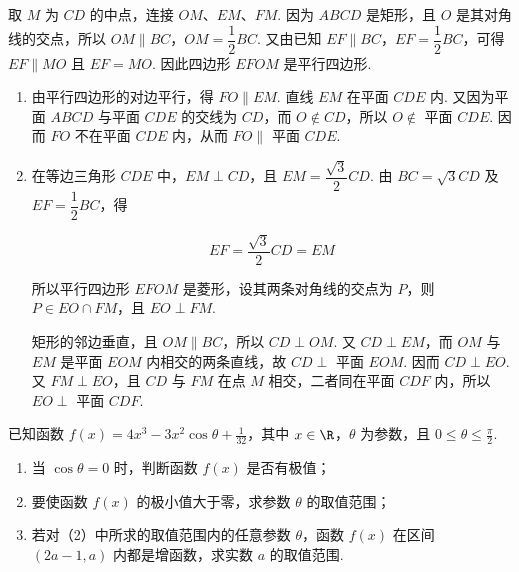 \begin{solution}
取 \(M\) 为 \(CD\) 的中点，连接 \(OM\)、\(EM\)、\(FM\). 因为 \(ABCD\) 是矩形，且 \(O\) 是其对角线的交点，所以 \(OM\parallel BC\)，\(OM=\dfrac{1}{2}BC\). 又由已知 \(EF\parallel BC\)，\(EF=\dfrac{1}{2}BC\)，可得 \(EF\parallel MO\) 且 \(EF=MO\). 因此四边形 \(EFOM\) 是平行四边形.

\begin{enumerate}
\item 由平行四边形的对边平行，得 \(FO\parallel EM\). 直线 \(EM\) 在平面 \(CDE\) 内. 又因为平面 \(ABCD\) 与平面 \(CDE\) 的交线为 \(CD\)，而 \(O\notin CD\)，所以 \(O\notin\) 平面 \(CDE\). 因而 \(FO\) 不在平面 \(CDE\) 内，从而 \(FO\parallel\) 平面 \(CDE\).

\item 在等边三角形 \(CDE\) 中，\(EM\perp CD\)，且 \(EM=\dfrac{\sqrt{3}}{2}CD\). 由 \(BC=\sqrt{3}CD\) 及 \(EF=\dfrac{1}{2}BC\)，得

\[
EF=\frac{\sqrt{3}}{2}CD=EM
\]

所以平行四边形 \(EFOM\) 是菱形，设其两条对角线的交点为 \(P\)，则 \(P\in EO\cap FM\)，且 \(EO\perp FM\).

矩形的邻边垂直，且 \(OM\parallel BC\)，所以 \(CD\perp OM\). 又 \(CD\perp EM\)，而 \(OM\) 与 \(EM\) 是平面 \(EOM\) 内相交的两条直线，故 \(CD\perp\) 平面 \(EOM\). 因而 \(CD\perp EO\). 又 \(FM\perp EO\)，且 \(CD\) 与 \(FM\) 在点 \(M\) 相交，二者同在平面 \(CDF\) 内，所以 \(EO\perp\) 平面 \(CDF\).
\end{enumerate}
\end{solution}

\begin{problem}
已知函数 \(f(x) = 4x^{3} - 3x^{2}\cos \theta + \frac{1}{32}\)，其中 \(x \in \R\)，\(\theta\) 为参数，且 \(0 \leqslant \theta \leqslant \frac{\pi}{2}\).

\begin{enumerate}
\item 当 \(\cos\theta = 0\) 时，判断函数 \(f(x)\) 是否有极值；
\item 要使函数 \(f(x)\) 的极小值大于零，求参数 \(\theta\) 的取值范围；
\item 若对（2）中所求的取值范围内的任意参数 \(\theta\)，函数 \(f(x)\) 在区间 \((2a - 1, a)\) 内都是增函数，求实数 \(a\) 的取值范围.
\end{enumerate}
\end{problem}

